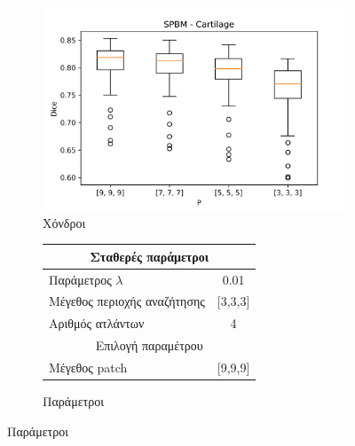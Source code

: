 \documentclass{beamer}
\begin{document}
\begin{frame}
\begin{figure}[H]
    \begin{subfigure}[b]{0.42\linewidth}
    \includegraphics[width=\linewidth]{SPBM_P_Cartilage_plot.png}
    \caption{Χόνδροι}
    \end{subfigure}
    \begin{subfigure}[b]{0.42\linewidth}
        \begin{tabular}[t]{|l|c|} 
            \multicolumn{2}{c}{\footnotesize Σταθερές παράμετροι} \\
            \hline
            \footnotesize Παράμετρος $\lambda$ & \footnotesize 0.01 \\
            \hline
            \footnotesize Μέγεθος περιοχής αναζήτησης & \footnotesize  [3,3,3] \\ 
            \hline
            \footnotesize Αριθμός ατλάντων & \footnotesize 4 \\ 
            \hline
            \multicolumn{2}{c}{\footnotesize Επιλογή παραμέτρου} \\
            \hline
            \footnotesize Μέγεθος patch & \footnotesize [9,9,9] \\
            \hline
        \end{tabular}
    \caption{Παράμετροι}
    \end{subfigure}
\end{figure}

\end{frame}
\end{document}
